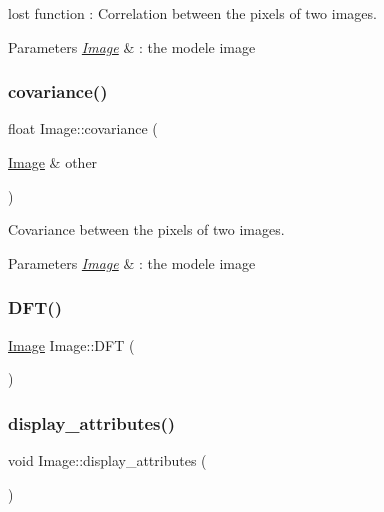 lost function \+: Correlation between the pixels of two images. 


\begin{DoxyParams}{Parameters}
{\em \hyperlink{class_image}{Image}} & \+: the modele image \\
\hline
\end{DoxyParams}
\mbox{\label{class_image_a1901bca6b241617d4ed24a534aef7076}} 
\subsubsection{\texorpdfstring{covariance()}{covariance()}}
{\footnotesize\ttfamily float Image\+::covariance (\begin{DoxyParamCaption}\item[{\hyperlink{class_image}{Image} \&}]{other }\end{DoxyParamCaption})}



Covariance between the pixels of two images. 


\begin{DoxyParams}{Parameters}
{\em \hyperlink{class_image}{Image}} & \+: the modele image \\
\hline
\end{DoxyParams}
\mbox{\label{class_image_aca2af304b9c00397cc4af4683f73cbaf}} 
\subsubsection{\texorpdfstring{D\+F\+T()}{DFT()}}
{\footnotesize\ttfamily \hyperlink{class_image}{Image} Image\+::\+D\+FT (\begin{DoxyParamCaption}{ }\end{DoxyParamCaption})}

\mbox{\label{class_image_a9f86b6ca3d6237ffdaeece483b9e2f62}} 
\subsubsection{\texorpdfstring{display\+\_\+attributes()}{display\_attributes()}}
{\footnotesize\ttfamily void Image\+::display\+\_\+attributes (\begin{DoxyParamCaption}{ }\end{DoxyParamCaption})}


